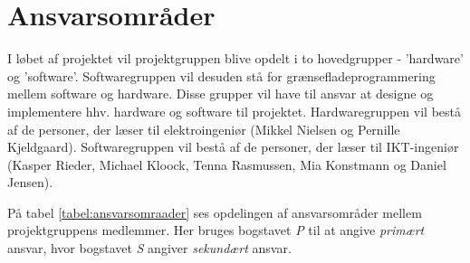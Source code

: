 \newpage
\section{Ansvarsområder}
I løbet af projektet vil projektgruppen blive opdelt i to hovedgrupper - 'hardware' og 'software'. Softwaregruppen vil desuden stå for grænsefladeprogrammering mellem software og hardware. Disse grupper vil have til ansvar at designe og implementere hhv. hardware og software til projektet. Hardwaregruppen vil bestå af de personer, der læser til elektroingeniør (Mikkel Nielsen og Pernille Kjeldgaard). Softwaregruppen vil bestå af de personer, der læser til IKT-ingeniør (Kasper Rieder, Michael Kloock, Tenna Rasmussen, Mia Konstmann og Daniel Jensen).

På tabel \ref{tabel:ansvarsomraader} ses opdelingen af ansvarsområder mellem projektgruppens medlemmer. Her bruges bogstavet \textit{P} til at angive \textit{primært} ansvar, hvor bogstavet \textit{S} angiver \textit{sekundært} ansvar.

